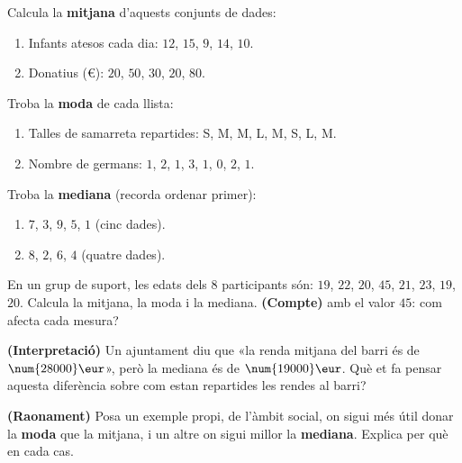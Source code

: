 \begin{exercicis}
\begin{exlist}
  \item Calcula la \textbf{mitjana} d'aquests conjunts de dades:
    \begin{enumerate}[label=\alph*), leftmargin=1.6em, topsep=2pt]
      \item Infants atesos cada dia: $12$, $15$, $9$, $14$, $10$.
      \item Donatius (€): $20$, $50$, $30$, $20$, $80$.
    \end{enumerate}
  \item Troba la \textbf{moda} de cada llista:
    \begin{enumerate}[label=\alph*), leftmargin=1.6em, topsep=2pt]
      \item Talles de samarreta repartides: S, M, M, L, M, S, L, M.
      \item Nombre de germans: $1$, $2$, $1$, $3$, $1$, $0$, $2$, $1$.
    \end{enumerate}
  \item Troba la \textbf{mediana} (recorda ordenar primer):
    \begin{enumerate}[label=\alph*), leftmargin=1.6em, topsep=2pt]
      \item $7$, $3$, $9$, $5$, $1$ (cinc dades).
      \item $8$, $2$, $6$, $4$ (quatre dades).
    \end{enumerate}
  \item En un grup de suport, les edats dels $8$ participants són:
        $19$, $22$, $20$, $45$, $21$, $23$, $19$, $20$. Calcula la mitjana, la moda i
        la mediana. \textbf{(Compte)} amb el valor $45$: com afecta cada mesura?
  \item \textbf{(Interpretació)} Un ajuntament diu que «la renda mitjana del barri és
        de $\num{28000}\eur$», però la mediana és de $\num{19000}\eur$. Què et fa
        pensar aquesta diferència sobre com estan repartides les rendes al barri?
  \item \textbf{(Raonament)} Posa un exemple propi, de l'àmbit social, on sigui més
        útil donar la \textbf{moda} que la mitjana, i un altre on sigui millor la
        \textbf{mediana}. Explica per què en cada cas.
\end{exlist}
\end{exercicis}

